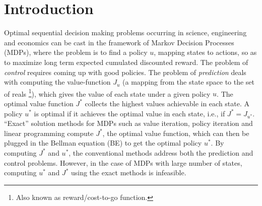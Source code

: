 \section{Introduction}\label{intro}
Optimal sequential decision making problems occurring in science, engineering and economics can be cast in the framework of Markov Decision Processes (MDPs), where the problem is to find a policy $u$, mapping states to actions, so as to maximize long term expected cumulated discounted reward. 
The problem of \emph{control} requires coming up with good policies.
The problem of \emph{prediction} deals with computing the value-function $J_u$ 
	(a mapping from the state space to the set of reals%
	\footnote{Also known as reward/cost-to-go function.}), 
	which gives the value of each state under a given policy $u$. 
The optimal value function $J^*$ collects the highest values achievable in each state.
A policy $u^*$ is optimal if it achieves the optimal value in each state, i.e., if $J^* = J_{u^*}$.
``Exact'' solution methods for MDPs \cite{BertB} such as value iteration, policy iteration and linear programming 
compute $J^*$, the optimal value function, 
which can then be plugged in the Bellman equation (BE) to get the optimal policy $u^*$.
By computing $J^*$ and $u^*$, the conventional methods address both the prediction and control problems. 
However, in the case of MDPs with large number of states, computing $u^*$ and $J^*$ using the exact methods is infeasible. 


